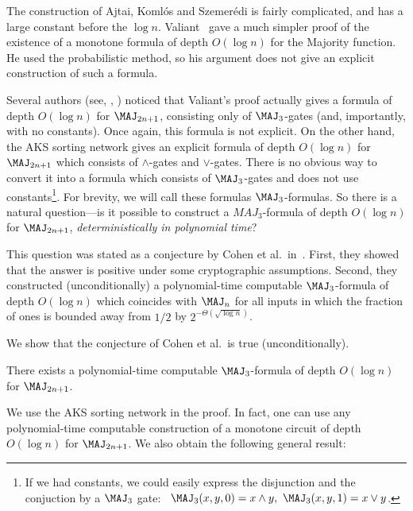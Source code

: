The construction of Ajtai, Koml\'{o}s and Szemer\'{e}di is fairly complicated, and has a %
large  %
constant before the $\log n$. Valiant~\cite{val84} gave a much simpler proof of %
the existence  %
%
of a monotone formula of depth $O(\log n)$
for the Majority function. He used the probabilistic method, so his argument does not give an explicit construction of such a formula.



Several authors (see, \eg, \cite{Gol2011,Cohen2013}) noticed that Valiant's proof actually gives 
%
a formula of depth $O(\log n)$  %
for $\MAJ_{2n+1}$, consisting only of $\MAJ_3$-gates (and, importantly, with no constants). Once again, this formula is not explicit. On the other hand, the AKS sorting network gives an explicit
%
formula of depth $O(\log n)$  %
for $\MAJ_{2n + 1}$ which consists of $\land$-gates and $\lor$-gates. There is no obvious way to convert it into a formula which consists of $\MAJ_3$-gates and does not use constants\footnote{If we %
had  %
constants, we could easily express the disjunction and the conjuction by
a $\MAJ_3$ gate:\  %
$\MAJ_3(x, y, 0) = x\land y,\ \MAJ_3(x, y, 1) = x\lor y$.}. For brevity, we will call these formulas $\MAJ_3$-formulas. So there is a natural 
question---is it possible %
to construct 
%
a $MAJ_3$-formula %
of depth $O(\log n)$  %
for $\MAJ_{2n + 1}$, \emph{deterministically in polynomial time}?
 
This question was stated as a conjecture by Cohen et al.~in~\cite{Cohen2013}. First, they showed that the answer is positive under some cryptographic assumptions. %
Second,  %
they constructed (unconditionally) a polynomial-time computable 
%
$\MAJ_3$-formula of depth $O(\log n)$  %
which coincides with $\MAJ_n$ for all inputs in which the fraction of ones is bounded away from $1/2$ by $2^{-\Theta(\sqrt{\log n})}$.

We show that the conjecture of Cohen et al.~is true (unconditionally).

\begin{theorem}
\label{cohen_conj_1}
There exists a polynomial-time computable 
%
$\MAJ_3$-formula of depth $O(\log n)$  %
for $\MAJ_{2n + 1}$.
\end{theorem}
We use the AKS sorting network in the proof. In fact, one can use any polynomial-time computable construction of 
%
a monotone circuit of depth $O(\log n)$  %
for $\MAJ_{2n + 1}$. We also obtain the following general result:

